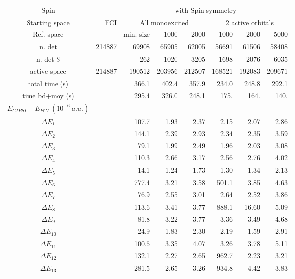 \documentclass[a4paper,10pt]{article}
\begin{document}
\begin{table*}[htbp]
  \begin{center}
 \begin{tabular}{|c|r|r|r|r|r|r|r|}
 \hline
Spin & &\multicolumn{6}{|c|}{with Spin symmetry}  \\
Starting space & FCI &\multicolumn{3}{|c|}{ All monoexcited } & \multicolumn{3}{|c|}{ 2 active orbitals }  \\
Ref. space & & min. size & 1000 & 2000 & 1000 & 2000 & 5000  \\
 \hline
n. det          		&214887	& 69908	& 65905	& 62005	& 56691	& 61506	&58408	 \\
n. det S        	 	& 	& 262 	& 1020	& 3205 	& 1698 	& 2076 	&6035	 \\
active space			&214887	&190512	&203956	&212507	&168521	&192083	&209671	\\
total time (s)    	       	&	& 366.1	& 402.4	& 357.9	& 234.0	& 248.8	&292.1	\\
time bd+moy (s)    		& 	& 295.4	& 326.0	& 248.1	& 175. 	& 164. 	&140.	 \\
\hline
\hline
$E_{CIPSI} - E_{FCI} ~(10^{-6}~a.u.)$ & & & & & & &  \\
$\Delta E_1 $    		&	& 107.7	& 1.93 	& 2.37 	& 2.15 	& 2.07 	&2.86	 \\
$\Delta E_2 $    		&	& 144.1	& 2.39 	& 2.93 	& 2.34 	& 2.35 	&3.59	 \\
$\Delta E_3 $   	 	&	& 79.1	& 1.99 	& 2.49 	& 1.96 	& 2.03 	&3.08	 \\
$\Delta E_4 $   	 	&	& 110.3	& 2.66 	& 3.17 	& 2.56 	& 2.76 	&4.02	 \\
$\Delta E_5 $   	 	&	& 14.1	& 1.24 	& 1.73 	& 1.30 	& 1.34 	&2.13	 \\
$\Delta E_6 $   	 	&	& 777.4	& 3.21 	& 3.58 	&501.1 	& 3.85 	&4.63	 \\
$\Delta E_7 $   	 	&	& 76.9	& 2.55 	& 3.01 	& 2.64 	& 2.52 	&3.86	 \\
$\Delta E_8$    		&	& 113.6	& 3.41 	& 3.77 	&888.1 	&16.60 	&5.09	 \\
$\Delta E_9 $  		  	&	& 81.8	& 3.22 	& 3.77 	& 3.36 	& 3.49 	&4.68	 \\
$\Delta E_{10} $  	 	&	& 24.9 	& 1.83 	& 2.30 	& 2.19 	& 1.59 	&2.91	\\
$\Delta E_{11} $ 	  	&	&100.6 	& 3.35 	& 4.07 	& 3.26 	& 3.78 	&5.11	 \\
$\Delta E_{12} $  	 	&	&132.1 	& 2.27 	& 2.65 	&962.7 	& 2.23 	&3.21	 \\
$\Delta E_{13} $ 	  	&	&281.5 	& 2.65 	& 3.26 	&934.8 	& 4.42 	&3.83	\\

\end{tabular}
\end{center}
\end{table*}
\end{document}
